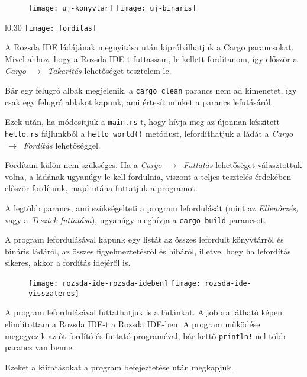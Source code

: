 \begin{figure}[h]
    \centering
    \texttt{[image: uj-konyvtar]}
    \texttt{[image: uj-binaris]}
\end{figure}

\newpage


\begin{wrapfigure}{l}{0.30\textwidth}
    \centering
    \texttt{[image: forditas]}
\end{wrapfigure}

A Rozsda IDE ládájának megnyitása után kipróbálhatjuk a Cargo parancsokat.
Mivel ahhoz, hogy a Rozsda IDE-t futtassam, le kellett fordítanom,
így először a \textit{Cargo $\,\to\,$ Takarítás} lehetőséget tesztelem le.

Bár egy felugró albak megjelenik, a \texttt{cargo clean} parancs nem ad kimenetet,
így csak egy felugró ablakot kapunk, ami értesít minket a parancs lefutásáról.

Ezek után, ha módosítjuk a \texttt{main.rs}-t, hogy hívja meg az újonnan készített
\texttt{hello.rs} fájlunkból a \texttt{hello\_world()} metódust,
lefordíthatjuk a ládát a \textit{Cargo $\,\to\,$ Fordítás} lehetőséggel.

Fordítani külön nem szükséges.
Ha a \textit{Cargo $\,\to\,$ Futtatás} lehetőséget választottuk volna,
a ládának ugyanúgy le kell fordulnia, viszont a teljes tesztelés érdekében
először fordítunk, majd utána futtatjuk a programot.

A legtöbb parancs, ami szükségelteti a program lefordulását (mint az \textit{Ellenőrzés,}
vagy a \textit{Tesztek futtatása}), ugyanúgy meghívja a \texttt{cargo build} parancsot.

A program lefordulásával kapunk egy listát az összes lefordult könyvtárról és bináris ládáról,
az összes figyelmeztetésről és hibáról, illetve, hogy ha lefordítás sikeres,
akkor a fordítás idejéről is.

\begin{figure}[h]
    \centering
    \texttt{[image: rozsda-ide-rozsda-ideben]}
    \texttt{[image: rozsda-ide-visszateres]}
\end{figure}

A program lefordulásával futtathatjuk is a ládánkat.
A jobbra látható képen elindítottam a Rozsda IDE-t a Rozsda IDE-ben.
A program működése megegyezik az őt fordító és futtató programéval, bár kettő
\texttt{println!}-nel több parancs van benne.

Ezeket a kiíratásokat a program befejeztetése után megkapjuk.
